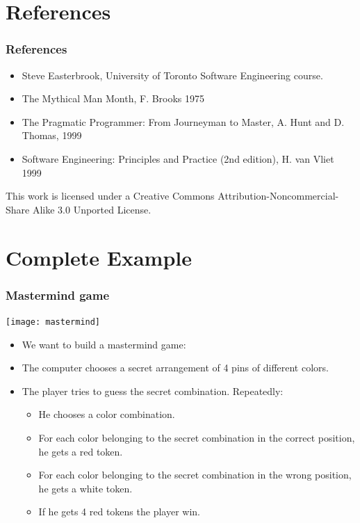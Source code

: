 \documentclass[10pt, handout]{beamer}
\begin{document}
\section{References}
\begin{frame}[fragile]
  \frametitle{References}
  \begin{itemize}
    \item Steve Easterbrook, University of Toronto Software Engineering course.
    \item The Mythical Man Month, F. Brooks 1975
    \item The Pragmatic Programmer: From Journeyman to Master, A. Hunt and
      D. Thomas, 1999
    \item Software Engineering: Principles and Practice (2nd edition), H. van Vliet 1999
  \end{itemize}
\end{frame}
\begin{frame}[fragile]
  \begin{center}
    \tiny
    This work is licensed under a Creative Commons Attribution-Noncommercial-Share Alike 3.0 Unported License.
  \end{center}
\end{frame}

\section{Complete Example}
\begin{frame}
\frametitle{Mastermind game}
\texttt{[image: mastermind]}
\begin{itemize}
\item We want to build a mastermind game:
\item The computer chooses a secret arrangement of 4 pins of different colors.
\item The player tries to guess the secret combination. Repeatedly:
  \begin{itemize}
  \item He chooses a color combination.
  \item For each color belonging to the secret combination
    in the correct position, he gets a red token.
  \item For each color belonging to the secret combination
    in the wrong position, he gets a white token.
  \item If he gets 4 red tokens the player win.
  \end{itemize}
\end{itemize}
\end{frame}
\end{document}
